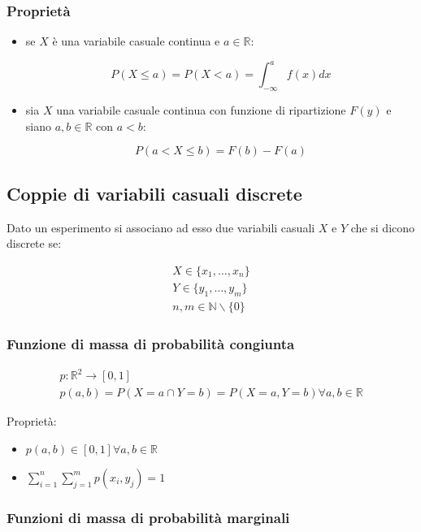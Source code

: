 \documentclass{article}
\begin{document}
\subsubsection{Proprietà}

\begin{itemize}
    \item se $X$ è una variabile casuale continua e $a \in \mathbb{R}$:

    $$
    P(X \leq a) = P(X < a) = \int^a_{-\infty}f(x)dx
    $$

    \item sia $X$ una variabile casuale continua con funzione di ripartizione $F(y)$ e siano $a,b \in \mathbb{R}$ con $a < b$:

    $$
    P(a < X \leq b) = F(b) - F(a)
    $$
\end{itemize}

\subsection{Coppie di variabili casuali discrete}

Dato un esperimento si associano ad esso due variabili casuali $X$ e $Y$ che si dicono discrete se:

$$
\begin{matrix}
X \in \{x_1, \dots, x_n\} \\
Y \in \{y_1, \dots, y_m\} \\
n,m \in \mathbb{N} \backslash \{0\}
\end{matrix}
$$

\subsubsection{Funzione di massa di probabilità congiunta}

$$
\begin{matrix}
p:\mathbb{R}^2 \to [0,1] \\
p(a,b) = P(X=a \cap Y=b) = P(X=a, Y=b) \forall a,b \in \mathbb{R}
\end{matrix}
$$

\noindent
Proprietà:

\begin{itemize}
    \item $p(a,b) \in [0,1] \forall a,b \in \mathbb{R}$
    \item $\sum^n_{i=1} \sum^m_{j=1} p(x_i, y_j) = 1$
\end{itemize}

\subsubsection{Funzioni di massa di probabilità marginali}
\end{document}
